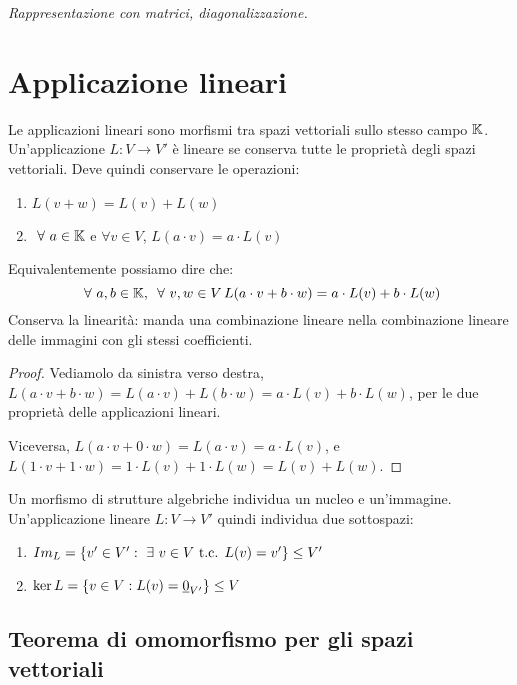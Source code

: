 \begin{center}
\indent
\textit{Rappresentazione con matrici, diagonalizzazione.}
\end{center}

\section{Applicazione lineari}

\begin{defn}
Le applicazioni lineari sono morfismi tra spazi vettoriali sullo stesso campo $\mathbb{K}$. Un'applicazione $L : V \to V'$ \`e lineare se conserva tutte le propriet\`a degli spazi vettoriali. Deve quindi conservare le operazioni:
\begin{enumerate}
    \item $L(v + w) = L(v) + L(w)$
    \item $ \forall a \in \field$ e $\forall v \in V$, $L(a \cdot v) = a \cdot L(v)$
\end{enumerate}
Equivalentemente possiamo dire che:
\[
\forall a, b \in \field , \, \forall v, w \in V \, L(a \cdot v + b \cdot w) = a \cdot L(v) + b \cdot L(w)
\]
Conserva la linearit\`a: manda una combinazione lineare nella combinazione lineare delle immagini con gli stessi coefficienti.
\end{defn}
\begin{proof}
Vediamolo da sinistra verso destra, $L(a \cdot v + b \cdot w) = L(a \cdot v) + L(b \cdot w) = a \cdot L(v) + b \cdot L(w)$, per le due propriet\`a delle applicazioni lineari.

Viceversa, $L(a \cdot v + 0 \cdot w) = L(a \cdot v) = a \cdot L(v)$, e $L(1 \cdot v + 1 \cdot w) = 1 \cdot L(v) + 1 \cdot L(w) = L(v) + L(w)$.
\end{proof}

Un morfismo di strutture algebriche individua un nucleo e un'immagine. Un'applicazione lineare $L: V \to V'$ quindi individua due sottospazi:
\begin{enumerate}
    \item $\image{L} = \{ v' \in V' : \exists v \in V \text{ t.c. } L(v) = v' \} \le V'$
    \item $\ker L = \{ v \in V : L(v) = \underline{0}_{V'} \} \le V$
\end{enumerate}

\subsection{Teorema di omomorfismo per gli spazi vettoriali}

